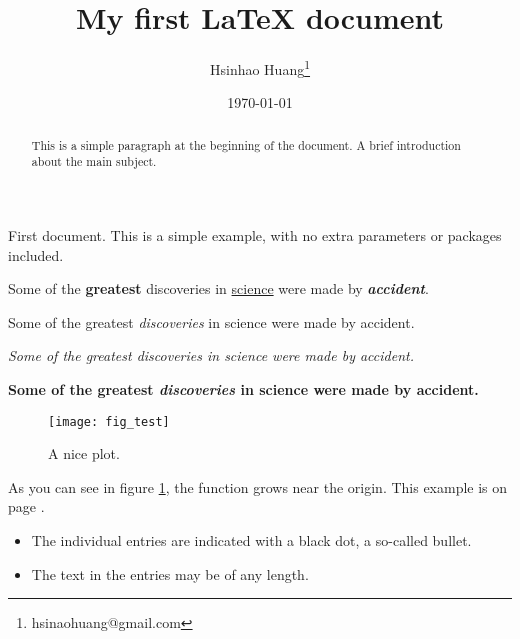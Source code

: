 \documentclass[12pt, a4paper]{article} %
\title{My first LaTeX document}                            %
\author{Hsinhao Huang\thanks{hsinaohuang@gmail.com}}       %
\date{\today}                                              %
\begin{document}

    \maketitle

    \begin{abstract}
        This is a simple paragraph at the beginning of the
        document. A brief introduction about the main subject.
    \end{abstract}

    First document. This is a simple example, with no
    extra parameters or packages included.

    Some of the \textbf{greatest}                          %
    discoveries in \underline{science}                     %
    were made by \textbf{\textit{accident}}.               %

    Some of the greatest \emph{discoveries} in science
    were made by accident.

    \textit{Some of the greatest \emph{discoveries}        %
    in science were made by accident.}

    \textbf{Some of the greatest \emph{discoveries}
    in science were made by accident.}

    \begin{figure}[h]
        \centering
        \texttt{[image: fig\_test]}   %
        \caption
        {
            A nice plot.
        }
        \label{fig:test}
    \end{figure}

    As you can see in figure \ref{fig:test},
    the function grows near the origin.
    This example is on page \pageref{fig:test}.

    \begin{itemize}                                        %
        \item The individual entries are indicated with
              a black dot, a so-called bullet.
        \item The text in the entries may be of any length.
    \end{itemize}
\end{document}
